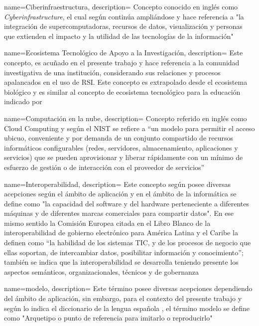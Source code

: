 
{
	name=Ciberinfraestructura,
	description=
	{
		Concepto conocido en inglés como \textit{Cyberinfrastructure}, el cual según \textcite{Stewart2019} continúa ampliándose y hace referencia a "la integración de supercomputadoras, recursos de datos, visualización y personas que extienden el impacto y la utilidad de las tecnologías de la información"
	}
}


{
	name={Ecosistema Tecnológico de Apoyo a la Investigación},
	description=
	{
		Este concepto, es acuñado en el presente trabajo y hace referencia a la comunidad investigativa de una institución, considerando sus relaciones y procesos apalancados en el uso de \acrfull{RSI}. Este concepto es extrapolado desde el ecosistema biológico y es similar al concepto de ecosistema tecnológico para la educación indicado por \parencite{Garcia-Holgado2018}
	}
}

{
	name=Computación en la nube,
	description=
	{
		Concepto referido en inglés como Cloud Computing y según el \acrfull{NIST} se refiere a “un modelo para permitir el acceso ubicuo, conveniente y por demanda de un conjunto compartido de recursos informáticos configurables (redes, servidores, almacenamiento, aplicaciones y servicios) que se pueden aprovisionar y liberar rápidamente con un mínimo de esfuerzo de gestión o de interacción con el proveedor de servicios” \parencite{Mell2011}
	}
}

{
	name=Interoperabilidad,
	description=
	{
		Este concepto según \textcite{Lara2007} posee diversas acepciones según el ámbito de aplicación y en el ámbito de la informática se define como "la capacidad del software y del hardware perteneciente a diferentes máquinas y de diferentes marcas comerciales para compartir datos". En ese mismo sentido la Comisión Europea citada en el Libro Blanco de la interoperabilidad de gobierno electrónico para América Latina y el Caribe \parencite{CEPAL2007} la definen como “la habilidad de los sistemas TIC, y de los procesos de negocio que ellas soportan, de intercambiar datos, posibilitar información y conocimiento”; también se indica que la interoperabilidad se desarrolla teniendo presente los aspectos semánticos, organizacionales, técnicos y de gobernanza
	}
}

{
	name=modelo,
	description=
	{
		Este término posee diversas acepciones dependiendo del ámbito de aplicación, sin embargo, para el contexto del presente trabajo y según lo indica el diccionario de la lengua española \parencite{RAE_Modelo2020}, el término modelo se define como "Arquetipo o punto de referencia para imitarlo o reproducirlo"
	}
}

